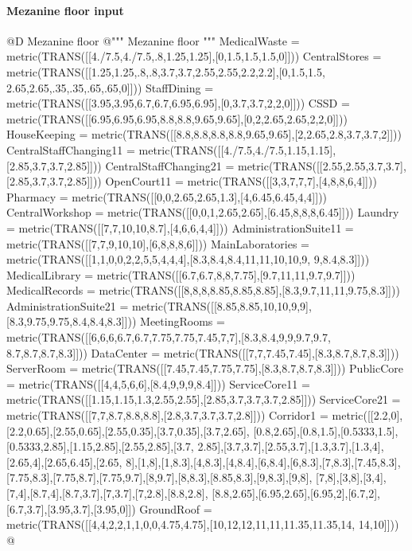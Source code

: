\documentclass[11pt,oneside]{article}    %
\begin{document}
\paragraph{Mezanine floor input}

@D Mezanine floor
@{""" Mezanine floor """
MedicalWaste = metric(TRANS([[4./7.5,4./7.5,.8,1.25,1.25],[0,1.5,1.5,1.5,0]]))
CentralStores = metric(TRANS([[1.25,1.25,.8,.8,3.7,3.7,2.55,2.55,2.2,2.2],[0,1.5,1.5,
    2.65,2.65,.35,.35,.65,.65,0]]))
StaffDining = metric(TRANS([[3.95,3.95,6.7,6.7,6.95,6.95],[0,3.7,3.7,2,2,0]]))
CSSD = metric(TRANS([[6.95,6.95,6.95,8.8,8.8,9.65,9.65],[0,2,2.65,2.65,2,2,0]]))
HouseKeeping = metric(TRANS([[8.8,8.8,8.8,8.8,9.65,9.65],[2,2.65,2.8,3.7,3.7,2]]))
CentralStaffChanging11 = metric(TRANS([[4./7.5,4./7.5,1.15,1.15],[2.85,3.7,3.7,2.85]]))
CentralStaffChanging21 = metric(TRANS([[2.55,2.55,3.7,3.7],[2.85,3.7,3.7,2.85]]))
OpenCourt11 = metric(TRANS([[3,3,7,7,7],[4,8,8,6,4]]))
Pharmacy = metric(TRANS([[0,0,2.65,2.65,1.3],[4,6.45,6.45,4,4]]))
CentralWorkshop = metric(TRANS([[0,0,1,2.65,2.65],[6.45,8,8,8,6.45]]))
Laundry = metric(TRANS([[7,7,10,10,8.7],[4,6,6,4,4]]))
AdministrationSuite11 = metric(TRANS([[7,7,9,10,10],[6,8,8,8,6]]))
MainLaboratories = metric(TRANS([[1,1,0,0,2,2,5,5,4,4,4],[8.3,8.4,8.4,11,11,10,10,9,
    9,8.4,8.3]]))
MedicalLibrary = metric(TRANS([[6.7,6.7,8,8,7.75],[9.7,11,11,9.7,9.7]]))
MedicalRecords = metric(TRANS([[8,8,8,8.85,8.85,8.85],[8.3,9.7,11,11,9.75,8.3]]))
AdministrationSuite21 = metric(TRANS([[8.85,8.85,10,10,9,9],[8.3,9.75,9.75,8.4,8.4,8.3]]))
MeetingRooms = metric(TRANS([[6,6,6,6.7,6.7,7.75,7.75,7.45,7,7],[8.3,8.4,9,9,9.7,9.7,
    8.7,8.7,8.7,8.3]]))
DataCenter = metric(TRANS([[7,7,7.45,7.45],[8.3,8.7,8.7,8.3]]))
ServerRoom = metric(TRANS([[7.45,7.45,7.75,7.75],[8.3,8.7,8.7,8.3]]))
PublicCore = metric(TRANS([[4,4,5,6,6],[8.4,9,9,9,8.4]]))
ServiceCore11 = metric(TRANS([[1.15,1.15,1.3,2.55,2.55],[2.85,3.7,3.7,3.7,2.85]]))
ServiceCore21 = metric(TRANS([[7,7,8.7,8.8,8.8],[2.8,3.7,3.7,3.7,2.8]]))
Corridor1 = metric([[2.2,0],[2.2,0.65],[2.55,0.65],[2.55,0.35],[3.7,0.35],[3.7,2.65],
    [0.8,2.65],[0.8,1.5],[0.5333,1.5],[0.5333,2.85],[1.15,2.85],[2.55,2.85],[3.7,
    2.85],[3.7,3.7],[2.55,3.7],[1.3,3.7],[1.3,4],[2.65,4],[2.65,6.45],[2.65,
    8],[1,8],[1,8.3],[4,8.3],[4,8.4],[6,8.4],[6,8.3],[7,8.3],[7.45,8.3],
    [7.75,8.3],[7.75,8.7],[7.75,9.7],[8,9.7],[8,8.3],[8.85,8.3],[9,8.3],[9,8],
    [7,8],[3,8],[3,4],[7,4],[8.7,4],[8.7,3.7],[7,3.7],[7,2.8],[8.8,2.8],
    [8.8,2.65],[6.95,2.65],[6.95,2],[6.7,2],[6.7,3.7],[3.95,3.7],[3.95,0]])
GroundRoof = metric(TRANS([[4,4,2,2,1,1,0,0,4.75,4.75],[10,12,12,11,11,11.35,11.35,14,
    14,10]]))
@}
\end{document}
